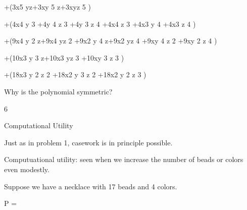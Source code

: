 \documentclass[a4paper,portrait,12pt]{article}
\begin{document}
\begin{flushleft}
+(3x5 yz+3xy 5 z+3xyz 5 )
\end{flushleft}


\begin{flushleft}
+(4x4 y 3 +4y 4 z 3 +4y 3 z 4 +4x4 z 3 +4x3 y 4 +4x3 z 4 )
\end{flushleft}


\begin{flushleft}
+(9x4 y 2 z+9x4 yz 2 +9x2 y 4 z+9x2 yz 4 +9xy 4 z 2 +9xy 2 z 4 )
\end{flushleft}


\begin{flushleft}
+(10x3 y 3 z+10x3 yz 3 +10xy 3 z 3 )
\end{flushleft}


\begin{flushleft}
+(18x3 y 2 z 2 +18x2 y 3 z 2 +18x2 y 2 z 3 )
\end{flushleft}





\begin{flushleft}
Why is the polynomial symmetric?
\end{flushleft}





6










\begin{flushleft}
Computational Utility
\end{flushleft}





\begin{flushleft}
Just as in problem 1, casework is in principle possible.
\end{flushleft}


\begin{flushleft}
Computuational utility: seen when we increase the number of beads or colors even modestly.
\end{flushleft}


\begin{flushleft}
Suppose we have a necklace with 17 beads and 4 colors.
\end{flushleft}


\begin{flushleft}
P =
\end{flushleft}
\end{document}
